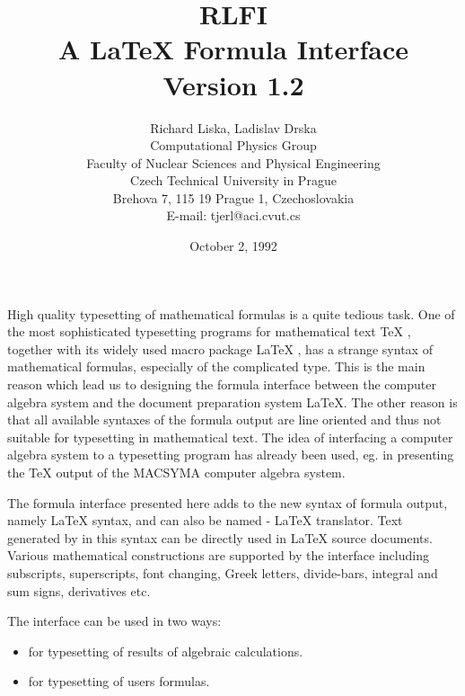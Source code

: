 \title{RLFI\\
       A \REDUCE{} \LaTeX{} Formula Interface\\
       Version 1.2}
\date{October 2, 1992}
\author{Richard Liska, Ladislav Drska\\
        Computational Physics Group\\
        Faculty of Nuclear Sciences and Physical Engineering\\
        Czech Technical University in Prague\\
        Brehova 7, 115 19 Prague 1, Czechoslovakia\\
        E-mail: tjerl@aci.cvut.cs}

\maketitle


High quality typesetting of mathematical formulas is a quite tedious
task.  One of the most sophisticated typesetting programs for
mathematical text \TeX{} \cite{Knuth:84}, together with its widely used
macro package \LaTeX{} \cite{Lamport:86}, has a strange syntax of
mathematical formulas, especially of the complicated type.  This is the
main reason which lead us to designing the formula interface between the
computer algebra system \REDUCE{} and the document preparation system
\LaTeX{}.  The other reason is that all available syntaxes of the
\REDUCE{} formula output are line oriented and thus not suitable for
typesetting in mathematical text.  The idea of interfacing a computer
algebra system to a typesetting program has already been used, eg.  in
\cite{Fateman:87} presenting the \TeX{} output of the MACSYMA computer
algebra system.

The formula interface presented here adds to \REDUCE{} the new syntax of
formula output, namely \LaTeX{} syntax, and can also be named \REDUCE{} -
\LaTeX{} translator.  Text generated by \REDUCE{} in this syntax can be
directly used in \LaTeX{} source documents.  Various mathematical
constructions are supported by the interface including subscripts,
superscripts, font changing, Greek letters, divide-bars, integral and
sum signs, derivatives etc.

The interface can be used in two ways:
\begin{itemize}
\item for typesetting of results of \REDUCE{} algebraic calculations.
\item for typesetting of users formulas.
\end{itemize}

